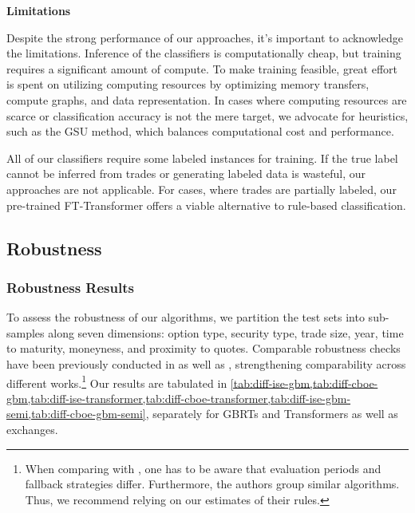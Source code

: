 \textbf{Limitations}

Despite the strong performance of our approaches, it's important to acknowledge the limitations. Inference of the classifiers is computationally cheap, but training requires a significant amount of compute. To make training feasible, great effort is spent on utilizing computing resources by optimizing memory transfers, compute graphs, and data representation. In cases where computing resources are scarce or classification accuracy is not the mere target, we advocate for heuristics, such as the \gls{GSU} method, which balances computational cost and performance.

All of our classifiers require some labeled instances for training. If the true label cannot be inferred from trades or generating labeled data is wasteful, our approaches are not applicable. For cases, where trades are partially labeled, our pre-trained FT-Transformer offers a viable alternative to rule-based classification.

\subsection{Robustness}\label{sec:robustness}


\subsubsection{Robustness Results}\label{sec:robustness-results}

To assess the robustness of our algorithms, we partition the test sets into sub-samples along seven dimensions: option type, security type, trade size, year, time to maturity, moneyness, and proximity to quotes. Comparable robustness checks have been previously conducted in \textcite[][47--50]{grauerOptionTradeClassification2022} as well as \textcite[][890--892]{savickasInferringDirectionOption2003}, strengthening comparability across different works.\footnote{When comparing with \textcite[][47--50]{grauerOptionTradeClassification2022}, one has to be aware that evaluation periods and fallback strategies differ. Furthermore, the authors group similar algorithms. Thus, we recommend relying on our estimates of their rules.} Our results are tabulated in \cref{tab:diff-ise-gbm,tab:diff-cboe-gbm,tab:diff-ise-transformer,tab:diff-cboe-transformer,tab:diff-ise-gbm-semi,tab:diff-cboe-gbm-semi}, separately for \glspl{GBRT} and Transformers as well as exchanges.

